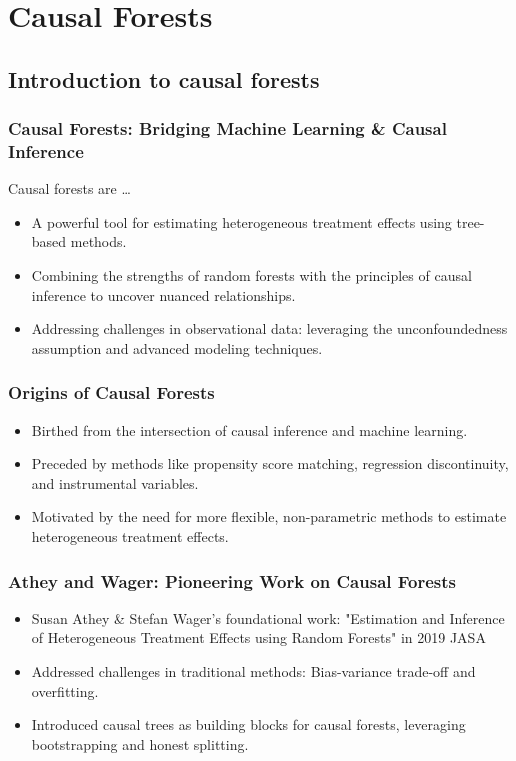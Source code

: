 \documentclass{beamer}
\begin{document}



\section{Causal Forests}

\subsection{Introduction to causal forests}



\begin{frame}
\frametitle{Causal Forests: Bridging Machine Learning \& Causal Inference}

Causal forests are \dots

\begin{itemize}
    \item A powerful tool for estimating heterogeneous treatment effects using tree-based methods.
    \item Combining the strengths of random forests with the principles of causal inference to uncover nuanced relationships.
    \item Addressing challenges in observational data: leveraging the unconfoundedness assumption and advanced modeling techniques.
\end{itemize}
\end{frame}

\begin{frame}
\frametitle{Origins of Causal Forests}
\begin{itemize}
    \item Birthed from the intersection of causal inference and machine learning.
    \item Preceded by methods like propensity score matching, regression discontinuity, and instrumental variables.
    \item Motivated by the need for more flexible, non-parametric methods to estimate heterogeneous treatment effects.
\end{itemize}
\end{frame}

\begin{frame}
\frametitle{Athey and Wager: Pioneering Work on Causal Forests}
\begin{itemize}
    \item Susan Athey \& Stefan Wager's foundational work: "Estimation and Inference of Heterogeneous Treatment Effects using Random Forests" in 2019 JASA
    \item Addressed challenges in traditional methods: Bias-variance trade-off and overfitting.
    \item Introduced causal trees as building blocks for causal forests, leveraging bootstrapping and honest splitting.
\end{itemize}
\end{frame}
\end{document}
